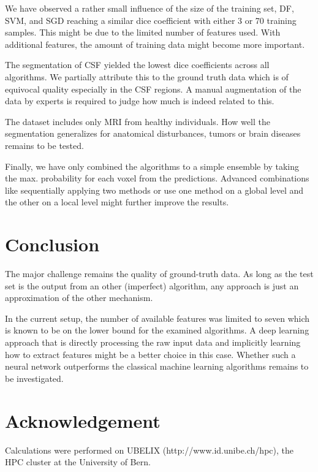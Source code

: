 \documentclass[journal]{IEEEtran}
\begin{document}
We have observed a rather small influence of the size of the training set, DF, SVM, and SGD reaching a similar dice coefficient with either 3 or 70 training samples. This might be due to the limited number of features used. With additional features, the amount of training data might become more important.

The segmentation of CSF yielded the lowest dice coefficients across all algorithms. We partially attribute this to the ground truth data which is of equivocal quality especially in the CSF regions. A manual augmentation of the data by experts is required to judge how much is indeed related to this.

The dataset includes only MRI from healthy individuals. How well the segmentation generalizes for anatomical disturbances, tumors or brain diseases remains to be tested.

Finally, we have only combined the algorithms to a simple ensemble by taking the max. probability for each voxel from the predictions. Advanced combinations like sequentially applying two methods or use one method on a global level and the other on a local level might further improve the results.

\section{Conclusion}
The major challenge remains the quality of ground-truth data. As long as the test set is the output from an other (imperfect) algorithm, any approach is just an approximation of the other mechanism.

In the current setup, the number of available features was limited to seven which is known to be on the lower bound for the examined algorithms. A deep learning approach that is directly processing the raw input data and implicitly learning how to extract features might be a better choice in this case. Whether such a neural network outperforms the classical machine learning algorithms remains to be investigated.

\section*{Acknowledgement}
Calculations were performed on UBELIX (http://www.id.unibe.ch/hpc), the HPC cluster at the University of Bern.



\end{document}
